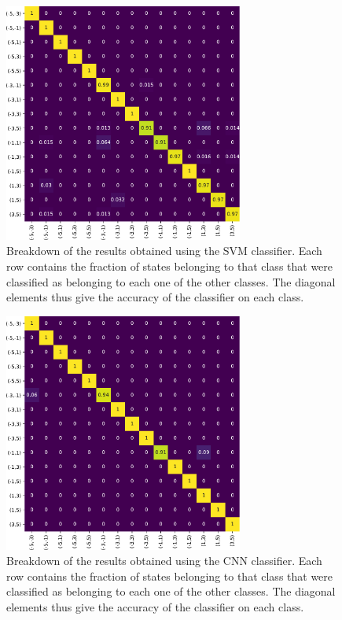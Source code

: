\begin{figure}[tb]
	\centering
	\includegraphics[width=0.7\textwidth]{Figures/VVBs/VVBs-svcAccuracies_15classes_halftrainingdata_40dims_usedInPaper.pdf}
	\caption{
		Breakdown of the results obtained using the SVM classifier.
		Each row contains the fraction of states belonging to that class that were classified as belonging to each one of the other classes. The diagonal elements thus give the accuracy of the classifier on each class.
	}
    \label{fig:VVBs:accuracies15classes_SVC}
\end{figure}

\begin{figure}[tb]
	\centering
	\includegraphics[width=0.7\textwidth]{Figures/VVBs/VVBs-accuracies15classes_CNN2.pdf}
	\caption{
		Breakdown of the results obtained using the CNN classifier.
		Each row contains the fraction of states belonging to that class that were classified as belonging to each one of the other classes. The diagonal elements thus give the accuracy of the classifier on each class.
	}
	\label{fig:VVBs:accuracies15classes_CNN}
\end{figure}


